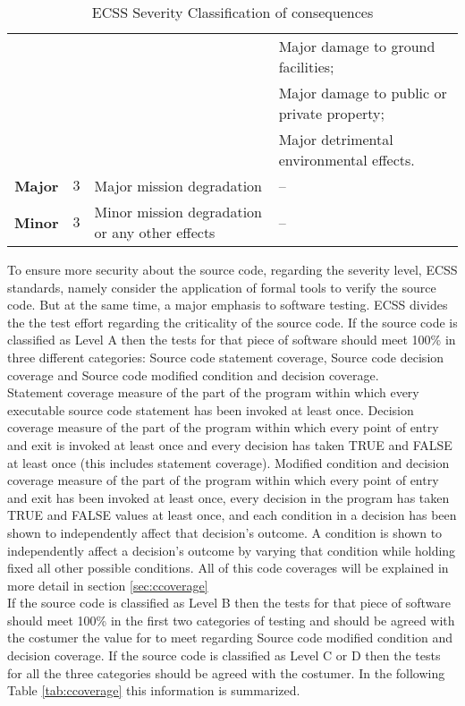 {\begin{table}[!ht]
\begin{tabular}{|c|c|m{4cm}|m{5cm}|}
& & & Major damage to ground facilities; \\ \cline{4-4}
& & & Major damage to public or private property;  \\ \cline{4-4}
& & & Major detrimental environmental effects.  \\\hline\hline
\textbf{Major} & $3$ & Major mission degradation & --\\\hline\hline
\textbf{Minor} & $3$ & Minor mission degradation or any other effects & --\\\hline
\end{tabular}
\caption{\protect\ac{ECSS} Severity Classification of consequences}\label{tab:severity}
\end{table}

To ensure more security about the source code, regarding the severity level, \ac{ECSS} standards, namely \cite{ecss-q-st-40c}
consider the application of formal tools to verify the source code. But at the same time, a major emphasis to software testing.
\ac{ECSS} divides the the test effort regarding the criticality of the source code.
If the source code is classified as Level A then the tests for that piece of software should meet 100\% in
three different categories: Source code statement coverage, Source code decision coverage and Source code modified condition and decision coverage.\\
Statement coverage measure of the part of the program within which every executable source code statement has been invoked at least once.
Decision coverage measure of the part of the program within which every point of entry and exit
is invoked at least once and every decision has taken TRUE and FALSE
at least once (this includes statement coverage).
Modified condition and decision coverage measure of the part of the program within which every point of entry and exit
has been invoked at least once, every decision in the program has taken TRUE and FALSE values at least once, and each condition in a decision has been
shown to independently affect that decision's outcome. A condition is shown to independently affect a
decision's outcome by varying that condition while holding fixed all other possible conditions. All of this code coverages will be explained in more detail in section
\ref{sec:ccoverage}\\
If the source code is classified as Level B then the tests for that piece of software should meet 100\% in the first two categories of testing and should be
agreed with the costumer the value for to meet regarding Source code modified condition and decision coverage.
If the source code is classified as Level C or D then the tests for all the three categories should be agreed with the costumer.
In the following Table \ref{tab:ccoverage} this information is summarized.

}
